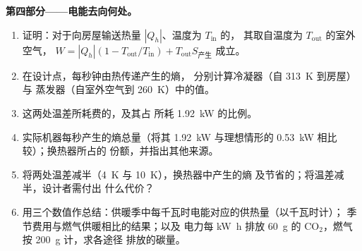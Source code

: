 \begin{problem}
\medskip
\noindent\textbf{第四部分——电能去向何处。}
\begin{enumerate}[resume]
  \item 证明：对于向房屋输送热量 $|Q_h|$、温度为 $T_{\mathrm{in}}$ 的，
        其取自温度为 $T_{\mathrm{out}}$ 的室外空气，
        $W = |Q_h|(1 - T_{\mathrm{out}}/T_{\mathrm{in}}) + T_{\mathrm{out}}S_{\text{产生}}$ 成立。
  \item 在设计点，每秒钟由热传递产生的熵，
        分别计算冷凝器（自 \qty{313}{K} 到房屋）与
        蒸发器（自室外空气到 \qty{260}{K}）中的值。
  \item 这两处温差所耗费的，及其占
        所耗 \qty{1.92}{kW} 的比例。
  \item 实际机器每秒产生的熵总量（将其
        \qty{1.92}{kW} 与理想情形的 \qty{0.53}{kW} 相比较）；换热器所占的
        份额，并指出其他来源。
  \item 将两处温差减半（\qty{4}{K} 与 \qty{10}{K}），换热器中产生的熵
        及节省的；将温差减半，设计者需付出
        什么代价？
  \item 用三个数值作总结：供暖季中每千瓦时电能对应的供热量（以千瓦时计）；
        季节费用与燃气供暖相比的结果；以及
        电力每
        \unit{kW h} 排放 \qty{60}{g} 的 CO$_2$，燃气按 \qty{200}{g} 计，求各途径
        排放的碳量。
\end{enumerate}
\end{problem}
